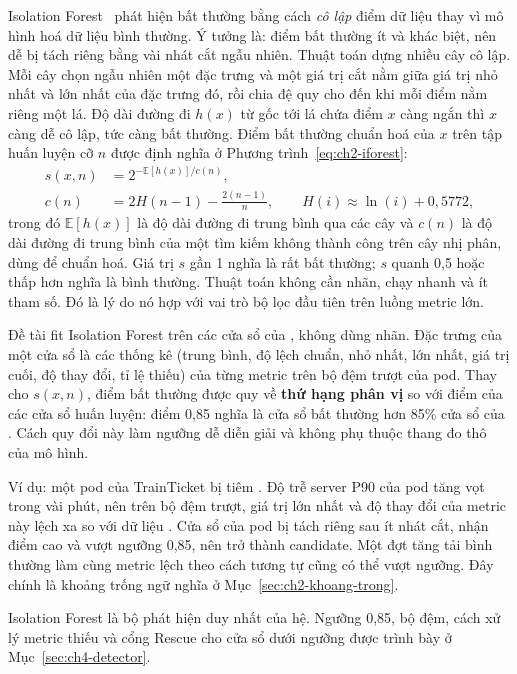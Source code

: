 Isolation Forest~\cite{liu2008iforest} phát hiện bất thường bằng cách \emph{cô lập} điểm dữ liệu thay vì mô hình hoá dữ liệu bình thường. Ý tưởng là: điểm bất thường ít và khác biệt, nên dễ bị tách riêng bằng vài nhát cắt ngẫu nhiên. Thuật toán dựng nhiều cây cô lập. Mỗi cây chọn ngẫu nhiên một đặc trưng và một giá trị cắt nằm giữa giá trị nhỏ nhất và lớn nhất của đặc trưng đó, rồi chia đệ quy cho đến khi mỗi điểm nằm riêng một lá. Độ dài đường đi $h(x)$ từ gốc tới lá chứa điểm $x$ càng ngắn thì $x$ càng dễ cô lập, tức càng bất thường. Điểm bất thường chuẩn hoá của $x$ trên tập huấn luyện cỡ $n$ được định nghĩa ở Phương trình~\eqref{eq:ch2-iforest}:
\begin{align}
  s(x, n) &= 2^{-\mathbb{E}[h(x)] / c(n)}, \nonumber \\
  c(n) &= 2 H(n - 1) - \frac{2(n - 1)}{n}, \qquad H(i) \approx \ln(i) + 0{,}5772,
  \label{eq:ch2-iforest}
\end{align}
trong đó $\mathbb{E}[h(x)]$ là độ dài đường đi trung bình qua các cây và $c(n)$ là độ dài đường đi trung bình của một tìm kiếm không thành công trên cây nhị phân, dùng để chuẩn hoá. Giá trị $s$ gần 1 nghĩa là rất bất thường; $s$ quanh 0,5 hoặc thấp hơn nghĩa là bình thường. Thuật toán không cần nhãn, chạy nhanh và ít tham số. Đó là lý do nó hợp với vai trò bộ lọc đầu tiên trên luồng metric lớn.

Đề tài fit Isolation Forest trên các cửa sổ của , không dùng nhãn. Đặc trưng của một cửa sổ là các thống kê (trung bình, độ lệch chuẩn, nhỏ nhất, lớn nhất, giá trị cuối, độ thay đổi, tỉ lệ thiếu) của từng metric trên bộ đệm trượt của pod. Thay cho $s(x, n)$, điểm bất thường được quy về \textbf{thứ hạng phân vị} so với điểm của các cửa sổ huấn luyện: điểm 0,85 nghĩa là cửa sổ bất thường hơn 85\% cửa sổ của . Cách quy đổi này làm ngưỡng dễ diễn giải và không phụ thuộc thang đo thô của mô hình.

Ví dụ: một pod  của TrainTicket bị tiêm . Độ trễ server P90 của pod tăng vọt trong vài phút, nên trên bộ đệm trượt, giá trị lớn nhất và độ thay đổi của metric này lệch xa so với dữ liệu . Cửa sổ của pod bị tách riêng sau ít nhát cắt, nhận điểm cao và vượt ngưỡng 0,85, nên trở thành candidate. Một đợt tăng tải bình thường làm cùng metric lệch theo cách tương tự cũng có thể vượt ngưỡng. Đây chính là khoảng trống ngữ nghĩa ở Mục~\ref{sec:ch2-khoang-trong}.

Isolation Forest là bộ phát hiện duy nhất của hệ. Ngưỡng 0,85, bộ đệm, cách xử lý metric thiếu và cổng Rescue cho cửa sổ dưới ngưỡng được trình bày ở Mục~\ref{sec:ch4-detector}.

